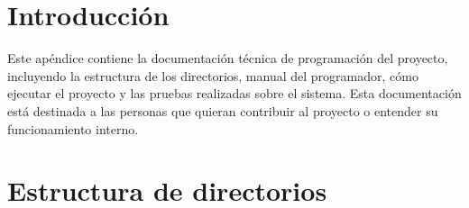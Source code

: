 
\section{Introducción}
Este apéndice contiene la documentación técnica de programación del proyecto, incluyendo la estructura de los directorios, manual del programador, cómo ejecutar el proyecto y las pruebas realizadas sobre el sistema. Esta documentación está destinada a las personas que quieran contribuir al proyecto o entender su funcionamiento interno.

\section{Estructura de directorios}
\label{sec:estructura-directorios}

